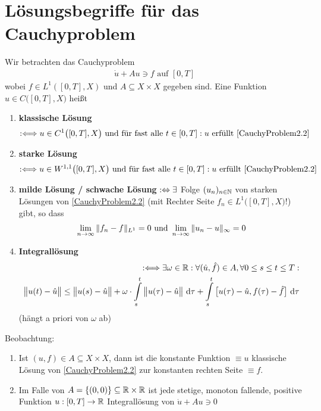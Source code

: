 \section*{Lösungsbegriffe für das Cauchyproblem} %
Wir betrachten das Cauchyproblem
\begin{align}\label{CauchyProblem2.2}\tag{CP}
\dot{u}+Au\ni f\text{ auf }[0,T] 
\end{align}
wobei $f\in L^1([0,T],X)$ und $A\subseteq X\times X$ gegeben sind. Eine Funktion $u\in C\big([0,T],X)$ heißt
\begin{enumerate}[label=(\alph*)]
\item \textbf{klassische Lösung}
\begin{align*}
:\Longleftrightarrow u\in C^1\big([0,T],X\big)\text{ und für fast alle }t\in[0,T]:u\text{ erfüllt }\eqref{CauchyProblem2.2}
\end{align*}
\item \textbf{starke Lösung}
\begin{align*}
:\Longleftrightarrow u\in W^{1,1}\big([0,T],X\big)\text{ und für fast alle }t\in[0,T]:u\text{ erfüllt }\eqref{CauchyProblem2.2}
\end{align*}
\item \textbf{milde Lösung / schwache Lösung} $:\Leftrightarrow\exists$ Folge $(u_n)_{n\in\mathbb{N}}$ von starken Lösungen von \eqref{CauchyProblem2.2} (mit Rechter Seite $f_n\in L^1\big([0,T],X\big)$!) gibt, so dass
\begin{align*}
\lim\limits_{n\to\infty}\Vert f_n-f\Vert_{L^1}=0\text{ und }\lim\limits_{n\to\infty}\Vert u_n-u\Vert_\infty=0
\end{align*}
\item \textbf{Integrallösung}
\begin{align*}
:\Longleftrightarrow\exists\omega\in\mathbb{R}:\forall(\hat{u},\hat{f})\in A,\forall 0\leq s\leq t\leq T:\\
\big\Vert u(t)-\hat{u}\big\Vert\leq\big\Vert u(s)-\hat{u}\big\Vert+\omega\cdot\int\limits_s^t\big\Vert u(\tau)-\hat{u}\big\Vert\text{ d}\tau+\int\limits_s^t\big[u(\tau)-\hat{u},f(\tau)-\hat{f}\big]\text{ d}\tau
\end{align*}
(hängt a priori von $\omega$ ab)
\end{enumerate}
Beobachtung:
\begin{enumerate}[label=(\alph*)]
\item Ist $(u,f)\in A\subseteq X\times X$, dann ist die konstante Funktion $\equiv u$ klassische Lösung von \eqref{CauchyProblem2.2} zur konstanten rechten Seite $\equiv f$.
\item Im Falle von $A=\lbrace(0,0)\rbrace\subseteq\mathbb{R}\times\mathbb{R}$ ist jede stetige, monoton fallende, positive Funktion $u:[0,T]\to\mathbb{R}$ %
Integrallösung von $\dot{u}+Au\ni 0$
\end{enumerate}

